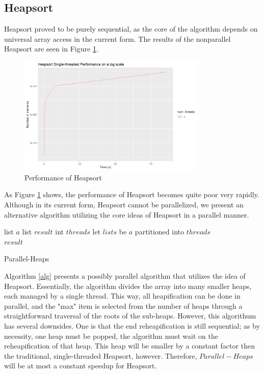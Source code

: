 \documentclass[conference]{IEEEtran}
\begin{document}
    
    \subsection{Heapsort}
    Heapsort proved to be purely sequential, as the core of the algorithm depends on universal array access in the current form. 
    The results of the nonparallel Heapsort are seen in Figure \ref{hs_per}. 
    \begin{figure}[h]
        \includegraphics[width=9cm]{hs_per.png} 
        \caption{Performance of Heapsort}
        \label{hs_per}
    \end{figure}
    As Figure \ref{hs_per} shows, the performance of Heapsort becomes quite poor very rapidly. 
    Although in its current form, Heapsort cannot be parallelized, we present an alternative algorithm utilizing the core ideas of Heapsort in a parallel manner. 
    
    \begin{algorithm}
        \SetAlgoLined
        list $a$\;
        list $result$\;
        int $threads$\;
        let $lists$ be $a$ partitioned into $threads$\\
        \Return $result$
        \caption{Parallel-Heaps}
        \label{alg}
    \end{algorithm}
    Algorithm \ref{alg} presents a possibly parallel algorithm that utilizes the idea of Heapsort. 
    Essentially, the algorithm divides the array into many smaller heaps, each managed by a single thread. 
    This way, all heapification can be done in parallel, and the "max" item is selected from the number of heaps through a straightforward traversal of the roots of the sub-heaps. 
    However, this algorithum has several downsides. 
    One is that the end reheapification is still sequential; as by necessity, one heap must be popped, the algorithm must wait on the reheapification of that heap. 
    This heap will be smaller by a constant factor then the traditional, single-threaded Heapsort, however. 
    Therefore, $Parallel-Heaps$ will be at most a constant speedup for Heapsort.
    
\end{document}
